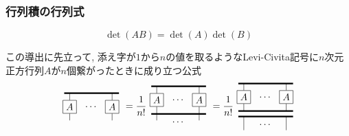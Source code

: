 \documentclass[dvipdfmx]{jsarticle}
\begin{document}
\subsubsection{行列積の行列式}

\begin{equation*}
    \det(AB)=\det(A)\det(B)
\end{equation*}

この導出に先立って, 添え字が$1$から$n$の値を取るようなLevi-Civita記号に$n$次元正方行列$A$が$n$個繋がったときに成り立つ公式
\begin{equation}
    \label{eq: matrix: insert Levi-Civita}
    \vcenter{\hbox{
        \begin{tikzpicture}
            \draw[ultra thick](0,0)--++(2,0);
            \draw
                (.2,0)--++(0,-.25)node[anchor=north, draw, rectangle](A){$A$}
                (A.south)--++(0,-.25)
                (1.75,0)--++(0,-.25)node[anchor=north, draw, rectangle](B){$A$}
                (B.south)--++(0,-.25)
            ;
            \node at(1,-.5)[anchor=center]{$\cdots$};
        \end{tikzpicture}
    }}
    =
    \frac{1}{n!}
    \vcenter{\hbox{
        \begin{tikzpicture}
            \draw[ultra thick]
                (0,0)--++(2,0)
                (0,-1)--++(2,0)
            ;
            \draw
                (.2,0)--++(0,-.25)node[anchor=north, draw, rectangle](A){$A$}
                (A.south)--++(0,-.5)
                (1.75,0)--++(0,-.25)node[anchor=north, draw, rectangle](B){$A$}
                (B.south)--++(0,-.5)
            ;
            \node at(1,-.5)[anchor=center]{$\cdots$};
            \node at(1,-1.3)[anchor=center]{$\cdots$};
        \end{tikzpicture}
    }}
    =
    \frac{1}{n!}
    \vcenter{\hbox{
        \begin{tikzpicture}
            \draw[ultra thick]
                (0,0)--++(2,0)
                (0,-1)--++(2,0)
                (0,-1.2)--++(2,0)
            ;
            \draw
                (.2,0)--++(0,-.25)node[anchor=north, draw, rectangle](A){$A$}
                (A.south)--++(0,-.25)
                (1.75,0)--++(0,-.25)node[anchor=north, draw, rectangle](B){$A$}
                (B.south)--++(0,-.25)
                (.2,-1.2)--++(0,-.5)
                (1.75,-1.2)--++(0,-.5)
            ;
            \node at(1,-.5)[anchor=center]{$\cdots$};
            \node at(1,-1.5)[anchor=center]{$\cdots$};
        \end{tikzpicture}
    }}
\end{equation}
\end{document}

